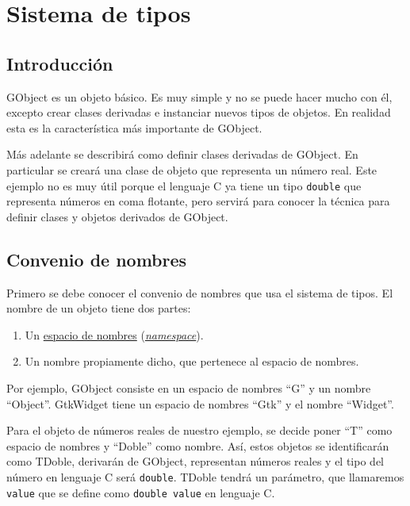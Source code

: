 %

\section{Sistema de tipos}
\subsection{Introducción}
\textsf{GObject} es un objeto básico. Es muy simple y no se puede hacer mucho con él, excepto crear
clases derivadas e instanciar nuevos tipos de objetos.
En realidad esta es la característica más importante de \textsf{GObject}.

Más adelante se describirá como definir clases derivadas de \textsf{GObject}.
En particular se creará una clase de objeto  que representa un número real.
Este ejemplo no es muy útil porque el lenguaje C ya tiene un tipo \texttt{double} que representa
números en coma flotante, pero servirá para conocer la técnica para definir clases y objetos derivados de \textsf{GObject}.

\subsection{Convenio de nombres}
Primero se debe conocer el convenio de nombres que usa el sistema de tipos.
El nombre de un objeto tiene dos partes:
\begin{enumerate}
  \tightlist
\item Un \href{https://es.wikipedia.org/wiki/Espacio_de_nombres}{espacio de nombres}
  (\href{https://en.wikipedia.org/wiki/Namespace}{\textit{namespace}}).
\item Un nombre propiamente dicho, que pertenece al espacio de nombres.
\end{enumerate}

Por ejemplo, \textsf{GObject} consiste en un espacio de nombres ``\textsf{G}'' y un nombre ``\textsf{Object}''.
\textsf{GtkWidget} tiene un espacio de nombres ``\textsf{Gtk}'' y el nombre ``\textsf{Widget}''.

Para el objeto de números reales de nuestro ejemplo, se decide poner ``\textsf{T}'' como espacio
de nombres y ``\textsf{Doble}'' como nombre. Así, estos objetos se identificarán como \textsf{TDoble},
derivarán de \textsf{GObject}, representan números reales y el tipo del número en
lenguaje C será \texttt{double}. \textsf{TDoble} tendrá un parámetro, que llamaremos
\texttt{value} que se  define como \texttt{double value} en lenguaje C.

